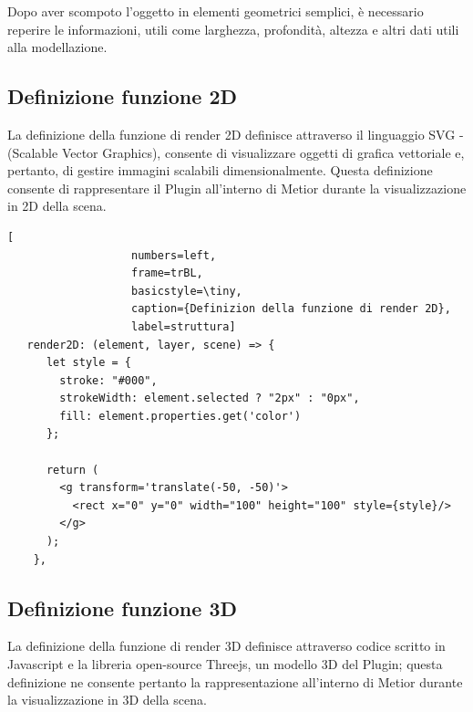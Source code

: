 Dopo aver scompoto l'oggetto in elementi geometrici semplici, è necessario reperire le informazioni, utili come
larghezza, profondità, altezza e altri dati utili alla modellazione.
\newpage

\subsection{Definizione funzione 2D}
La definizione della funzione di render 2D definisce attraverso il linguaggio SVG - (Scalable Vector Graphics),
consente di visualizzare oggetti di grafica vettoriale e, pertanto, di gestire immagini scalabili dimensionalmente.
Questa definizione consente di rappresentare il Plugin all'interno di Metior durante la visualizzazione in 2D della scena.\\

\begin{lstlisting}[
                   numbers=left,
                   frame=trBL,
                   basicstyle=\tiny,
                   caption={Definizion della funzione di render 2D},
                   label=struttura]
   render2D: (element, layer, scene) => {
      let style = {
        stroke: "#000",
        strokeWidth: element.selected ? "2px" : "0px",
        fill: element.properties.get('color')
      };

      return (
        <g transform='translate(-50, -50)'>
          <rect x="0" y="0" width="100" height="100" style={style}/>
        </g>
      );
    },
\end{lstlisting}
\newpage

\subsection{Definizione funzione 3D}
La definizione della funzione di render 3D definisce attraverso codice scritto in Javascript e la libreria open-source Threejs,
un modello 3D del Plugin; questa definizione ne consente pertanto la rappresentazione all'interno di Metior
durante la visualizzazione in 3D della scena.\\



